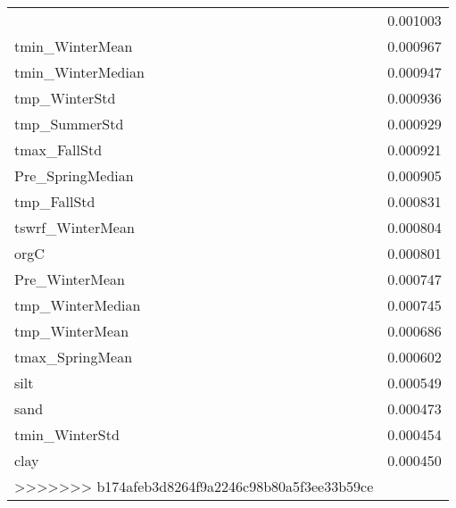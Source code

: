 \begin{tabular}{lr}
\begin{tabular}{rrrrr}
tmin_SpringMedian & 0.001003 \\
tmin_WinterMean & 0.000967 \\
tmin_WinterMedian & 0.000947 \\
tmp_WinterStd & 0.000936 \\
tmp_SummerStd & 0.000929 \\
tmax_FallStd & 0.000921 \\
Pre_SpringMedian & 0.000905 \\
tmp_FallStd & 0.000831 \\
tswrf_WinterMean & 0.000804 \\
orgC & 0.000801 \\
Pre_WinterMean & 0.000747 \\
tmp_WinterMedian & 0.000745 \\
tmp_WinterMean & 0.000686 \\
tmax_SpringMean & 0.000602 \\
silt & 0.000549 \\
sand & 0.000473 \\
tmin_WinterStd & 0.000454 \\
clay & 0.000450 \\
>>>>>>> b174afeb3d8264f9a2246c98b80a5f3ee33b59ce
\bottomrule
\end{tabular}
